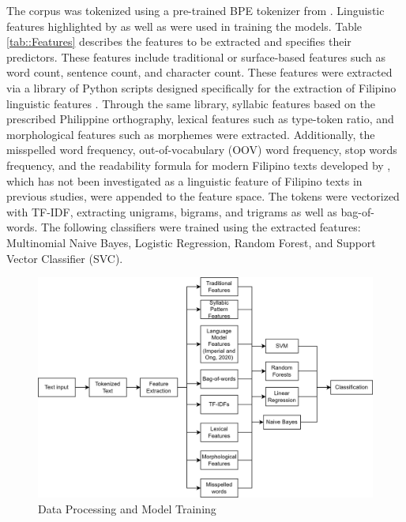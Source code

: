 The corpus was tokenized using a pre-trained BPE tokenizer from . Linguistic features highlighted by  as well as  were used in training the models. Table \ref{tab::Features} describes the features to be extracted and specifies their predictors. These features include traditional or surface-based features such as word count, sentence count, and character count. These features were extracted via a library of Python scripts designed specifically for the extraction of Filipino linguistic features \cite{imperial-2020, imperial-2021}. Through the same library, syllabic features based on the prescribed Philippine orthography, lexical features such as type-token ratio, and morphological features such as morphemes were extracted. Additionally, the misspelled word frequency, out-of-vocabulary (OOV) word frequency, stop words frequency, and the readability formula for modern Filipino texts developed by , which has not been investigated as a linguistic feature of Filipino texts in previous studies, were appended to the feature space. The tokens were vectorized with TF-IDF, extracting unigrams, bigrams, and trigrams as well as bag-of-words. The following classifiers were trained using the extracted features: Multinomial Naive Bayes, Logistic Regression, Random Forest, and Support Vector Classifier (SVC).

\begin{figure}[h]
\includegraphics[width=\textwidth,height=\textheight,keepaspectratio]{figures/Model Training.png}
  \caption{Data Processing and Model Training}
  \label{fig:Model}
\end{figure}

\clearpage

